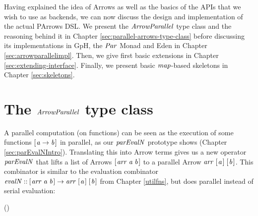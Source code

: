 \documentclass[paper=A4,twoside=true,openright,parskip=full,chapterprefix=true,headings=normal,bibliography=totoc,listof=totoc,titlepage=on,captions=tableabove,draft=false,british]{scrreprt}%
\begin{document}
\label{sec:parallel-arrows}

Having explained the idea of Arrows as well as the basics of the APIs
that we wish to use as backends, we can now discuss the design and
implementation of the actual PArrows DSL. We present the \ensuremath{\Conid{ArrowParallel}}
type class and the reasoning behind it in Chapter
\ref{sec:parallel-arrows-type-class} before discussing its
implementations in GpH, the \ensuremath{\Conid{Par}} Monad and Eden in Chapter
\ref{sec:arrowparallelimpl}. Then, we give first basic extensions in
Chapter \ref{sec:extending-interface}. Finally, we present basic
\ensuremath{\Varid{map}}-based skeletons in Chapter \ref{sec:skeletons}.

\hypertarget{the-arrowparallel-type-class}{%
\section{\texorpdfstring{The \ensuremath{\Conid{ArrowParallel}} type
class}{The  type class}}\label{the-arrowparallel-type-class}}

\label{sec:parallel-arrows-type-class}

A parallel computation (on functions) can be seen as the execution of
some functions \ensuremath{[\mskip1.5mu \Varid{a}\to \Varid{b}\mskip1.5mu]} in parallel, as our \ensuremath{\Varid{parEvalN}} prototype shows
(Chapter \ref{sec:parEvalNIntro}). Translating this into Arrow terms
gives us a new operator \ensuremath{\Varid{parEvalN}} that lifts a list of Arrows
\ensuremath{[\mskip1.5mu \Varid{arr}\;\Varid{a}\;\Varid{b}\mskip1.5mu]} to a parallel Arrow \ensuremath{\Varid{arr}\;[\mskip1.5mu \Varid{a}\mskip1.5mu]\;[\mskip1.5mu \Varid{b}\mskip1.5mu]}. This combinator is
similar to the evaluation combinator \ensuremath{\Varid{evalN}\mathbin{::}[\mskip1.5mu \Varid{arr}\;\Varid{a}\;\Varid{b}\mskip1.5mu]\to \Varid{arr}\;[\mskip1.5mu \Varid{a}\mskip1.5mu]\;[\mskip1.5mu \Varid{b}\mskip1.5mu]}
from Chapter \ref{utilfns}, but does parallel instead of serial
evaluation:


\begin{hscode}\SaveRestoreHook
{}%
%
\>[B]{}\mathbin{::}(\;)\to {}\<[E]%
\ColumnHook
\end{hscode}\resethooks
\vspace{-2\baselineskip}
\end{document}
